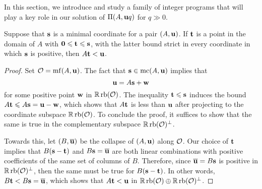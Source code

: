 \documentclass[11pt]{amsart}
\begin{document}
In this section, we introduce and study a family of integer programs that will play a key role in our solution of $\Pi(A, \mathbf{u}q)$ for $q \gg 0$.    


\begin{lemma}
\label{less than u: L}  Suppose that $\mathbf{s}$ is a minimal coordinate for a pair $(A, \mathbf{u})$.  If $\mathbf{t}$ is a point in the domain of $A$ with $\mathbf{0} \leqslant \mathbf{t} \leqslant \mathbf{s}$, with the latter bound strict in every coordinate in which $\mathbf{s}$ is positive, then $A \mathbf{t} < \mathbf{u}$.
\end{lemma}

\begin{proof}  Set $\mathcal{O} = \operatorname{mf}(A, \mathbf{u})$.  The fact that $\mathbf{s} \in \operatorname{mc}(A, \mathbf{u})$  implies that \[ \mathbf{u} = A \mathbf{s} + \mathbf{w}\] for some positive point $\mathbf{w}$ in $\mathbb{R} \operatorname{rb}(\mathcal{O})$.     The inequality $\mathbf{t} \leqslant \mathbf{s}$ induces the bound $A \mathbf{t} \leqslant A \mathbf{s} = \mathbf{u} - \mathbf{w}$, which shows that $A\mathbf{t}$ is less than $\mathbf{u}$ after projecting to the coordinate subspace $\mathbb{R} \operatorname{rb}(\mathcal{O})$.  To conclude the proof, it suffices to show that the same is true in the complementary subspace $\mathbb{R} \operatorname{rb}(\mathcal{O})^{\perp}$.  

Towards this, let $(B,\overline{\mathbf{u}})$ be the collapse of $(A,\mathbf{u})$ along $\mathcal{O}$.  Our choice of $\mathbf{t}$ implies that $B( \mathbf{s} - \mathbf{t})$ and $B \mathbf{s} = \overline{\mathbf{u}}$ are both linear combinations with positive coefficients of the same set of columns of $B$.  Therefore, since $\overline{\mathbf{u}} = B \mathbf{s}$ is positive in $\mathbb{R} \operatorname{rb}(\mathcal{O})^{\perp}$, then the same must be true for $B(\mathbf{s} - \mathbf{t})$.  In other words, $B \mathbf{t} < B \mathbf{s} = \overline{\mathbf{u}}$, which shows that $A \mathbf{t} < \mathbf{u}$ in $\mathbb{R} \operatorname{rb}(\mathcal{O}) \oplus \mathbb{R} \operatorname{rb}(\mathcal{O})^{\perp}$.
\end{proof}


%
%
%
\end{document}
